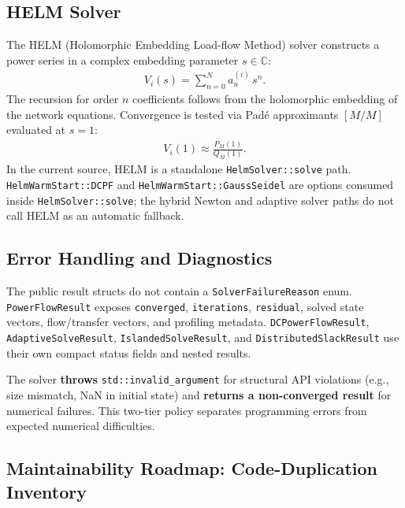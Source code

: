 \subsection{HELM Solver}

The HELM (Holomorphic Embedding Load-flow Method) solver constructs a power
series in a complex embedding parameter \(s\in\mathbb{C}\):
\begin{align}
V_i(s) = \sum_{n=0}^{N} a_n^{(i)}\,s^n.
\end{align}
The recursion for order \(n\) coefficients follows from the holomorphic
embedding of the network equations.  Convergence is tested via Padé approximants
\([M/M]\) evaluated at \(s=1\):
\begin{align}
V_i(1) \approx \frac{P_M(1)}{Q_M(1)}.
\end{align}
In the current source, HELM is a standalone \texttt{HelmSolver::solve} path.
\texttt{HelmWarmStart::DCPF} and \texttt{HelmWarmStart::GaussSeidel} are options
consumed inside \texttt{HelmSolver::solve}; the hybrid Newton and adaptive
solver paths do not call HELM as an automatic fallback.

\subsection{Error Handling and Diagnostics}

The public result structs do not contain a \texttt{SolverFailureReason} enum.
\texttt{PowerFlowResult} exposes \texttt{converged}, \texttt{iterations},
\texttt{residual}, solved state vectors, flow/transfer vectors, and profiling
metadata.  \texttt{DCPowerFlowResult}, \texttt{AdaptiveSolveResult},
\texttt{IslandedSolveResult}, and \texttt{DistributedSlackResult} use their own
compact status fields and nested results.

The solver \textbf{throws} \texttt{std::invalid\_argument} for structural API
violations (e.g., size mismatch, NaN in initial state) and \textbf{returns
a non-converged result} for numerical failures.  This two-tier policy separates
programming errors from expected numerical difficulties.

\subsection{Maintainability Roadmap: Code-Duplication Inventory}
\label{sec:pf-dedup}

